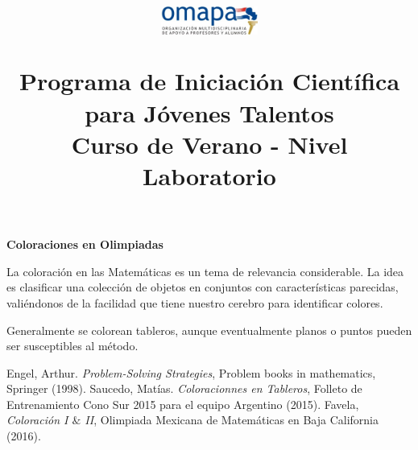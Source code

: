 \documentclass{article}
\title{
\begin{center}
	\includegraphics[width=120px, height=40px]{omapa.jpg}
	\vspace{1cm}
\end{center}
Programa de Iniciaci\'on Cient\'ifica para J\'ovenes Talentos \\ \Large Curso de Verano - Nivel Laboratorio
}
\date{}
\begin{document}
	\maketitle


	\begin{center}
		{\bfseries {\LARGE Coloraciones en Olimpiadas}}
	\end{center}
	

	


	La coloraci\'on en las Matem\'aticas es un tema de relevancia considerable. La idea es clasificar una colecci\'on de objetos en conjuntos con caracter\'isticas parecidas, vali\'endonos de la facilidad que tiene nuestro cerebro para identificar colores. 
	
	Generalmente se colorean tableros, aunque eventualmente planos o puntos pueden ser susceptibles al m\'etodo.
	
	
	
	
	
	
	\begin{thebibliography}{99}
	
	
	 Engel, Arthur. \emph{Problem-Solving Strategies}, Problem books in mathematics, Springer (1998).
	 Saucedo, Mat\'ias. \emph{Coloracionnes en Tableros}, Folleto de Entrenamiento Cono Sur 2015 para el equipo Argentino (2015).
	 Favela, \emph{Coloraci\'on I $\&$ II}, Olimpiada Mexicana de Matem\'aticas en Baja California (2016).
	
	
	\end{thebibliography}
\end{document}
